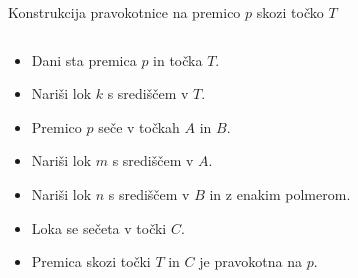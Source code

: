 \begin{frame}{Konstrukcija pravokotnice na premico $p$ skozi točko $T$}
	\begin{columns}
		\begin{column}{0.55\textwidth}
		  \begin{itemize}
			 \item<1-> Dani sta premica $p$ in točka $T$.
			 \item<2-> Nariši lok $k$ s središčem v $T$.
			 \item<3-> Premico $p$ seče v točkah $A$ in $B$.
			 \item<4-> Nariši lok $m$ s središčem v $A$.
			 \item<5-> Nariši lok $n$ s središčem v $B$ in z enakim polmerom.
			 \item<6-> Loka se sečeta v točki $C$.
			 \item<7-> Premica skozi točki $T$ in $C$ je pravokotna na $p$.
		  \end{itemize}
		\end{column}
		\begin{column}{0.45\textwidth}
			\centering
\end{column}
\end{columns}
\end{frame}
